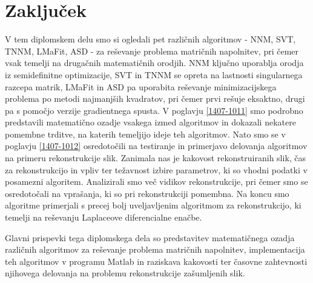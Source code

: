 \chapter{Zaključek}\label{1407-1013}

V tem diplomskem delu smo si ogledali pet različnih algoritmov - NNM, SVT, TNNM, LMaFit, ASD - za reševanje problema matričnih napolnitev, pri čemer vsak temelji na drugačnih matematičnih orodjih.
NNM ključno uporablja orodja iz semidefinitne optimizacije, 
SVT in TNNM se opreta na lastnosti singularnega razcepa matrik, 
LMaFit in ASD pa uporabita reševanje minimizacijskega problema po metodi najmanjših kvadratov, pri čemer prvi rešuje eksaktno, drugi pa s pomočjo verzije gradientnega spusta.
V poglavju \ref{1407-1011} smo podrobno predstavili matematično ozadje vsakega izmed algoritmov
in dokazali nekatere pomembne trditve, na katerih temeljijo ideje teh algoritmov.
Nato smo se v poglavju \ref{1407-1012}
osredotočili na testiranje in primerjavo delovanja algoritmov na primeru rekonstrukcije slik. Zanimala nas je kakovost rekonstruiranih slik, čas za rekonstrukcijo in vpliv ter težavnost izbire parametrov, ki so vhodni podatki v posamezni algoritem.
Analizirali smo več vidikov rekonstrukcije, pri čemer smo se osredotočali na vprašanja, ki so pri rekonstrukciji pomembna. Na koncu smo algoritme primerjali s precej bolj uveljavljenim algoritmom za rekonstrukcijo,
ki temelji na reševanju Laplaceove diferencialne enačbe. 

Glavni prispevki tega diplomskega dela so 
predstavitev matematičnega ozadja različnih algoritmov za reševanje problema matričnih napolnitev,
implementacija teh algoritmov v programu Matlab in raziskava kakovosti ter časovne zahtevnosti njihovega delovanja na problemu rekonstrukcije zašumljenih slik.

